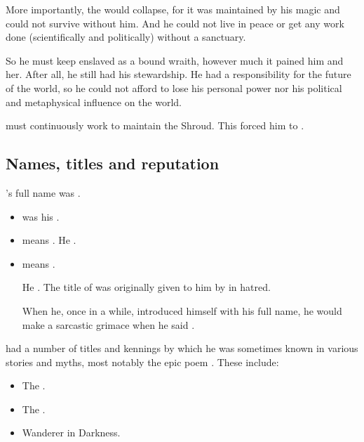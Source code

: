 More importantly, the  would collapse, for it was maintained by his magic and could not survive without him.
And he could not live in peace or get any work done (scientifically and politically) without a sanctuary.

So he must keep \Rystessakhin enslaved as a bound wraith, however much it pained him and her.
After all, he still had his stewardship.
He had a responsibility for the future of the world, so he could not afford to lose his personal power nor his political and metaphysical influence on the world.

\Ishnaruchaefir must continuously work to maintain the Shroud. 
This forced him to . 










\subsection{Names, titles and reputation}
\Ishnaruchaefir's full name was \Quessanth \Melechet \Nierzshah \Tzeorossh \Ishnaruchaefir.

\begin{itemize}
  \item 
    \quo{\Melechet} was his . 
  \item 
    \quo{\Nierzshah} means .
    He . 
  \item 
    \quo{\Tzeorossh} means .
    
    He . 
    The title of  was originally given to him by \Secherdamon in hatred.
    
    When he, once in a while, introduced himself with his full name, he would make a sarcastic grimace when he said \quo{\Tzeorossh}.
\end{itemize}

\Ishnaruchaefir{} had a number of titles and kennings by which he was sometimes known in various stories and myths, most notably the epic poem \emph{}. 
These include:

\begin{itemize}
  \item The .
  \item The .
  \item Wanderer in Darkness. 
\end{itemize}






